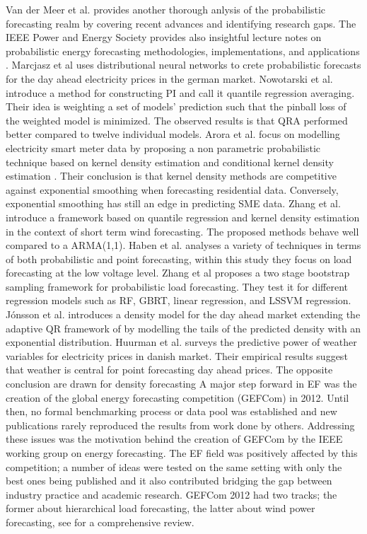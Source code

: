 Van der Meer et al. \cite{van2018review} provides another thorough anlysis of the probabilistic forecasting realm by covering recent advances and identifying research gaps.
The IEEE Power and Energy Society provides also insightful lecture notes on probabilistic energy forecasting methodologies,
implementations, and applications \cite{gm_22}.
Marcjasz et al \cite{probablistic_electricity_forecast2} uses distributional neural networks to crete probabilistic forecasts for the day ahead electricity prices in the german market.
Nowotarski et al. \cite{nowotarski2015computing} introduce a method for constructing PI and call it quantile regression averaging. Their idea is weighting a set of models' prediction such that the pinball loss of the weighted model is minimized. The observed results is that QRA performed better compared to twelve individual models.
Arora et al. \cite{arora2016forecasting} focus on modelling electricity smart meter data by proposing a non parametric probabilistic technique based on kernel density estimation and conditional kernel density estimation \cite{rosenblatt1969conditional} \cite{hyndman1996estimating}. Their conclusion is that kernel density methods are competitive against exponential smoothing when forecasting residential data. Conversely, exponential smoothing has still an edge in predicting SME data.
Zhang et al. \cite{zhang2020probability} introduce a framework based on quantile regression and kernel density estimation in the context of short term wind forecasting. The proposed methods behave well compared to a ARMA(1,1).
Haben et al. \cite{haben2018short} analyses a variety of techniques in terms of both probabilistic and point forecasting, within this study they focus on load forecasting at the low voltage level.
Zhang et al \cite{zhang2020two} proposes a two stage bootstrap sampling framework for probabilistic load forecasting. They test it for different regression models such as RF, GBRT, linear regression, and LSSVM regression.
Jónsson et al. \cite{jonsson2014predictive}
introduces a density model for the day ahead market extending the adaptive QR framework of \cite{moller2008time} by modelling the tails of the predicted density with an exponential distribution.
Huurman et al. \cite{huurman2012power} surveys the predictive power of weather variables for electricity prices in danish market. Their empirical results suggest that weather is central for point forecasting day ahead prices. The opposite conclusion are drawn for density forecasting
A major step forward in EF was the creation of the global energy forecasting competition (GEFCom) in 2012. Until then, no formal benchmarking process or data pool was established and new publications rarely reproduced the results from work done by others. Addressing these issues was the motivation behind the creation of GEFCom by the IEEE working group on energy forecasting. The EF field was positively affected by this competition; a number of ideas were tested on the same setting with only the best ones being published and it also contributed bridging the gap between industry practice and academic research. GEFCom 2012 had two tracks; the former about hierarchical load forecasting, the latter about wind power forecasting, see \cite{hong2014global} for a comprehensive review. 
